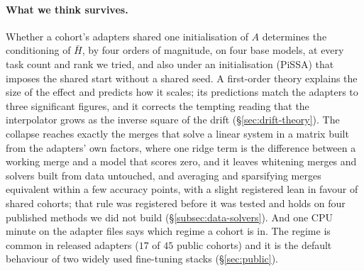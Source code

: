 \paragraph{What we think survives.} Whether a cohort's adapters shared one
initialisation of $A$ determines the conditioning of $\bar H$, by four orders
of magnitude, on four base models, at every task count and rank we tried, and
also under an initialisation (PiSSA) that imposes the shared start without a
shared seed. A first-order theory explains the size of the effect and predicts
how it scales; its predictions match the adapters to three significant figures,
and it corrects the tempting reading that the interpolator grows as the inverse
square of the drift (\S\ref{sec:drift-theory}). The collapse reaches exactly the
merges that solve a linear system in a matrix built from the adapters' own
factors, where one ridge term is the difference between a working merge and a
model that scores zero, and it leaves whitening merges and solvers built from
data untouched, and averaging and sparsifying merges equivalent within a few
accuracy points, with a slight registered lean in favour of shared cohorts;
that rule was registered before
it was tested and holds on four published methods we did not build
(\S\ref{subsec:data-solvers}). And one CPU minute on the adapter files says
which regime a cohort is in. The regime is common in released adapters
($17$ of $45$ public cohorts) and it is the default behaviour of two widely used
fine-tuning stacks (\S\ref{sec:public}).

